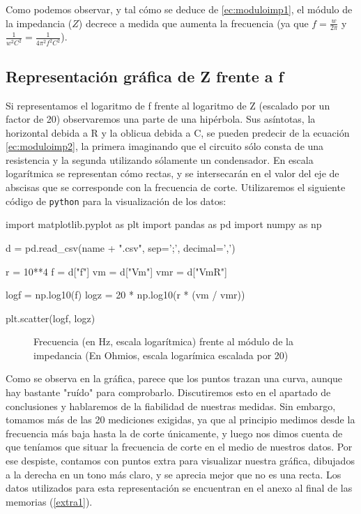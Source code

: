 \documentclass[12pt, a4paper, titlepage]{article}
\newcommand{\code}[1]{\texttt{#1}} %
\begin{document}
  Como podemos observar, y tal cómo se deduce de \ref{ec:moduloimp1}, el módulo de la impedancia ($Z$) decrece a medida que aumenta la frecuencia (ya que $f = \frac{w}{2\pi}$ y $\frac{1}{w^2C^2} = \frac{1}{4\pi^2f^2C^2}$).

  \subsection{Representación gráfica de Z frente a f}

  Si representamos el logaritmo de f frente al logaritmo de Z (escalado por un factor de 20) observaremos una parte de una hipérbola. Sus asíntotas, la horizontal debida a R y la oblicua debida a C, se pueden predecir de la ecuación \ref{ec:moduloimp2}, la primera imaginando que el circuito sólo consta de una resistencia y la segunda utilizando sólamente un condensador. En escala logarítmica se representan cómo rectas, y se intersecarán en el valor del eje de abscisas que se corresponde con la frecuencia de corte. Utilizaremos el siguiente código de \code{python} para la visualización de los datos:

  \begin{python}
    import matplotlib.pyplot as plt
    import pandas as pd
    import numpy as np

    d = pd.read_csv(name + ".csv", sep=';', decimal=',')

    r = 10**4
    f = d["f"]
    vm = d["Vm"]
    vmr = d["VmR"]

    logf = np.log10(f)
    logz = 20 * np.log10(r * (vm / vmr))

    plt.scatter(logf, logz)
  \end{python}

  \begin{figure}[H]
    \resizebox{\columnwidth}{!}{
    
    }
    \caption{Frecuencia (en Hz, escala logarítmica) frente al módulo de la impedancia (En Ohmios, escala logarímica escalada por 20)}
  \end{figure}

  Como se observa en la gráfica, parece que los puntos trazan una curva, aunque hay bastante "ruído" para comprobarlo. Discutiremos esto en el apartado de conclusiones y hablaremos de la fiabilidad de nuestras medidas. Sin embargo, tomamos más de las 20 mediciones exigidas, ya que al principio medimos desde la frecuencia más baja hasta la de corte únicamente, y luego nos dimos cuenta de que teníamos que situar la frecuencia de corte en el medio de nuestros datos. Por ese despiste, contamos con puntos extra para visualizar nuestra gráfica, dibujados a la derecha en un tono más claro, y se aprecia mejor que no es una recta. Los datos utilizados para esta representación se encuentran en el anexo al final de las memorias (\ref{extra1}).
\end{document}
